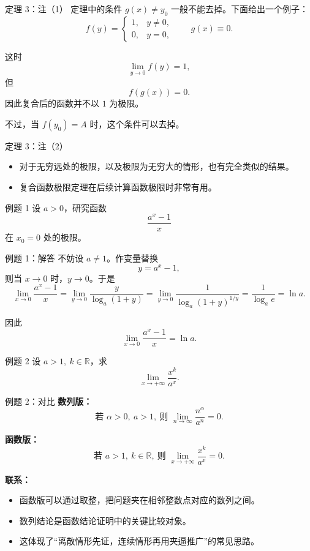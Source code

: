 ﻿\documentclass[aspectratio=169,11pt]{ctexbeamer}
\begin{document}
\begin{frame}{定理 3：注（1）}
定理中的条件 $g(x)\ne y_0$ 一般不能去掉。下面给出一个例子：
\[
  f(y)=
  \begin{cases}
    1, & y\ne 0,\\
    0, & y=0,
  \end{cases}
  \qquad g(x)\equiv 0.
\]

这时
\[
  \lim_{y\to 0} f(y)=1,
\]
但
\[
  f(g(x))=0.
\]
因此复合后的函数并不以 $1$ 为极限。

\vspace{0.5em}
不过，当 $f(y_0)=A$ 时，这个条件可以去掉。
\end{frame}

\begin{frame}{定理 3：注（2）}
\begin{itemize}
  \item 对于无穷远处的极限，以及极限为无穷大的情形，也有完全类似的结果。
  \item 复合函数极限定理在后续计算函数极限时非常有用。
\end{itemize}
\end{frame}

\begin{frame}{例题 1}
设 $a>0$，研究函数
\[
  \frac{a^x-1}{x}
\]
在 $x_0=0$ 处的极限。
\end{frame}

\begin{frame}{例题 1：解答}
不妨设 $a\ne 1$。作变量替换
\[
  y=a^x-1,
\]
则当 $x\to 0$ 时，$y\to 0$。于是
\[
  \lim_{x\to 0}\frac{a^x-1}{x}
  =
  \lim_{y\to 0}\frac{y}{\log_a(1+y)}
  =
  \lim_{y\to 0}\frac{1}{\log_a(1+y)^{1/y}}
  =
  \frac{1}{\log_a e}
  =
  \ln a.
\]

因此
\[
  \lim_{x\to 0}\frac{a^x-1}{x}=\ln a.
\]
\end{frame}

\begin{frame}{例题 2}
设 $a>1,\ k\in\mathbb{R}$，求
\[
  \lim_{x\to +\infty}\frac{x^k}{a^x}.
\]
\end{frame}

\begin{frame}{例题 2：对比}
\textbf{数列版：}
\[
  \text{若 }\alpha>0,\ a>1,\ \text{则 }\lim_{n\to\infty}\frac{n^\alpha}{a^n}=0.
\]

\vspace{0.8em}
\textbf{函数版：}
\[
  \text{若 }a>1,\ k\in\mathbb{R},\ \text{则 }\lim_{x\to+\infty}\frac{x^k}{a^x}=0.
\]

\vspace{0.8em}
\textbf{联系：}
\begin{itemize}
  \item 函数版可以通过取整，把问题夹在相邻整数点对应的数列之间。
  \item 数列结论是函数结论证明中的关键比较对象。
  \item 这体现了“离散情形先证，连续情形再用夹逼推广”的常见思路。
\end{itemize}
\end{frame}
\end{document}
